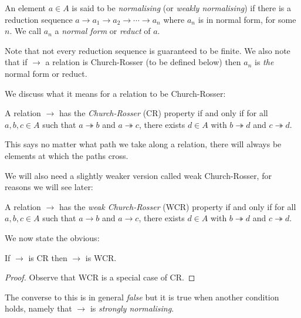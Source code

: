 \begin{defin}
    An element $a \in A$ is said to be \emph{normalising} (or \emph{weakly normalising}) if there is a reduction sequence $a \to a_1 \to a_2 \to \cdots \to a_n$ where $a_n$ is in normal form, for some $n$. We call $a_n$ a \emph{normal form} or \emph{reduct} of $a$.
\end{defin}

% 
\begin{remark}
    Note that not every reduction sequence is guaranteed to be finite. We also note that if $\to$ a relation is Church-Rosser (to be defined below) then $a_n$ is \emph{the} normal form or reduct.
\end{remark}

We discuss what it means for a relation to be Church-Rosser:

\begin{defin}
    A relation $\to$ has the \emph{Church-Rosser} (CR) property if and only if for all $a,b,c \in A$ such that $a \twoheadrightarrow b$ and $a \twoheadrightarrow c$, there exists $d \in A$ with $b \twoheadrightarrow d$ and $c \twoheadrightarrow d$.
\end{defin}

\begin{remark}
    This says no matter what path we take along a relation, there will always be elements at which the paths cross.
\end{remark}

We will also need a slightly weaker version called weak Church-Rosser, for reasons we will see later:

\begin{defin}
    A relation $\to$ has the \emph{weak Church-Rosser} (WCR) property if and only if for all $a, b, c \in A$ such that $a \to b$ and $a \to c$, there exists $d \in A$ with $b \twoheadrightarrow d$ and $c \twoheadrightarrow d$.
\end{defin}

We now state the obvious:

\begin{cor}\label{cr_is_wcr}
    If $\to$ is CR then $\to$ is WCR.
\end{cor}

\begin{proof}
    Observe that WCR is a special case of CR.
\end{proof}

The converse to this is in general \emph{false} but it is true when another condition holds, namely that $\to$ is \emph{strongly normalising}.

